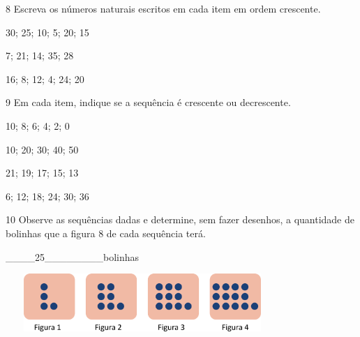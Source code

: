\begin{escolha}
\num{8} Escreva os números naturais escritos em cada item em ordem crescente.

\begin{escolha}

\item
  30; 25; 10; 5; 20; 15

\item
  7; 21; 14; 35; 28

\item
  16; 8; 12; 4; 24; 20

\end{escolha}

\num{9} Em cada item, indique se a sequência é crescente ou decrescente.

\begin{escolha}

\item
  10; 8; 6; 4; 2; 0

\item
  10; 20; 30; 40; 50

\item
  21; 19; 17; 15; 13

\item
  6; 12; 18; 24; 30; 36

\end{escolha}

\num{10} Observe as sequências dadas e determine, sem fazer desenhos, a
quantidade de bolinhas que a figura 8 de cada sequência terá.


\begin{escolha}

\item
  \_\_\_\_25\_\_\_\_\_\_\_\_bolinhas
\end{escolha}

\includegraphics[width=4.09202in,height=0.85841in]{media/image32.png}


\end{escolha}
